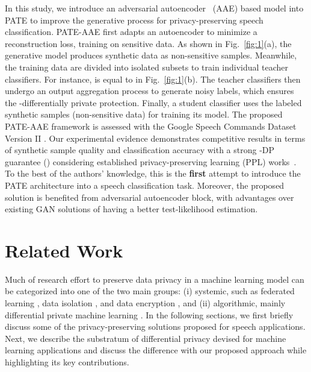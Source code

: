 \documentclass[a4paper]{article}
\begin{document}
In this study, we introduce an adversarial autoencoder~\cite{makhzani2015adversarial} (AAE) based model into PATE to improve the generative process for privacy-preserving speech classification. PATE-AAE first adapts an autoencoder to minimize a reconstruction loss, training on sensitive data. As shown in Fig.~\ref{fig:1}(a), the generative model produces synthetic data as non-sensitive samples. Meanwhile, the training data are divided into  isolated subsets to train individual teacher classifiers. For instance,  is equal to  in Fig.~\ref{fig:1}(b). The teacher classifiers then undergo an output aggregation process to generate noisy labels, which ensures the -differentially private protection. Finally, a student classifier uses the labeled synthetic samples (non-sensitive data) for training its model. The proposed PATE-AAE framework is assessed with the Google Speech Commands Dataset Version II \cite{warden2018speech}. Our experimental evidence demonstrates competitive results in terms of synthetic sample quality and classification accuracy with a strong -DP guarantee () considering established privacy-preserving learning (PPL) works~\cite{jordon2019pate, xie2018differentially}. To the best of the authors' knowledge, this is the \textbf{first} attempt to introduce the PATE architecture into a speech classification task. Moreover, the proposed solution is benefited from adversarial autoencoder block, with advantages over existing GAN solutions \cite{fredrikson2015model, jordon2019pate} of having a better test-likelihood estimation.






\section{Related Work}
Much of research effort to preserve data privacy in a machine learning model can be categorized into one of the two main groups: (i) systemic, such as federated learning \cite{leroy2019federated}, data isolation \cite{yang2020decentralizing}, and data encryption \cite{glackin2017privacy}, and (ii) algorithmic, mainly differential private machine learning \cite{abadi2016deep}. In the following sections, we first briefly discuss some of the privacy-preserving solutions proposed for speech applications. Next, we describe the substratum of differential privacy devised for machine learning applications and discuss the difference with our proposed approach while highlighting its key contributions.
\end{document}
